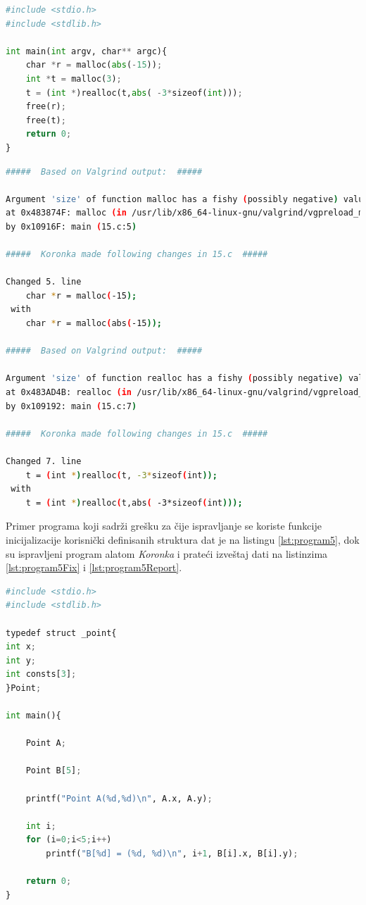 \documentclass[12pt,oneside]{memoir}
\theoremstyle{plain}
\theoremstyle{definition}
\begin{document}
\begin{lstlisting}[style=mystyle,caption={Predlog rešenja alata \textit{Koronka} za greške otkrivene u programu sa listinga \ref{lst:program4}}, label={lst:program4Fix},language={Python}] 
#include <stdio.h>
#include <stdlib.h>

int main(int argv, char** argc){
	char *r = malloc(abs(-15));
	int *t = malloc(3);
	t = (int *)realloc(t,abs( -3*sizeof(int))); 
	free(r);
	free(t);
	return 0;
}
\end{lstlisting}

\begin{lstlisting}[style=terminal,caption={Izveštaj o radu alata \textit{Koronka} za program sa listinga \ref{lst:program4}}, label={lst:program4Report},language={bash}]   
#####  Based on Valgrind output:  #####

Argument 'size' of function malloc has a fishy (possibly negative) value: -15
at 0x483874F: malloc (in /usr/lib/x86_64-linux-gnu/valgrind/vgpreload_memcheck-amd64-linux.so)
by 0x10916F: main (15.c:5)

#####  Koronka made following changes in 15.c  #####

Changed 5. line 
	char *r = malloc(-15);
 with 
	char *r = malloc(abs(-15));

#####  Based on Valgrind output:  #####

Argument 'size' of function realloc has a fishy (possibly negative) value: -12
at 0x483AD4B: realloc (in /usr/lib/x86_64-linux-gnu/valgrind/vgpreload_memcheck-amd64-linux.so)
by 0x109192: main (15.c:7)

#####  Koronka made following changes in 15.c  #####

Changed 7. line 
	t = (int *)realloc(t, -3*sizeof(int)); 
 with 
	t = (int *)realloc(t,abs( -3*sizeof(int))); 

\end{lstlisting}

Primer programa koji sadrži grešku za čije ispravljanje se koriste funkcije inicijalizacije korisnički definisanih struktura dat je na listingu \ref{lst:program5}, dok su ispravljeni program alatom \textit{Koronka} i prateći izveštaj dati na listinzima \ref{lst:program5Fix} i \ref{lst:program5Report}.

\begin{lstlisting}[style=mystyle,caption={Program koji sadrži grešku za čije ispravljanje se koriste funkcije inicijalizacije korisnički definisanih struktura}, label={lst:program5},language={Python}] 
#include <stdio.h>
#include <stdlib.h>

typedef struct _point{
int x;
int y;
int consts[3];
}Point;

int main(){

	Point A;

	Point B[5];

	printf("Point A(%d,%d)\n", A.x, A.y);
	
	int i;
	for (i=0;i<5;i++)
		printf("B[%d] = (%d, %d)\n", i+1, B[i].x, B[i].y);

	return 0;
}
\end{lstlisting}
\end{document}
